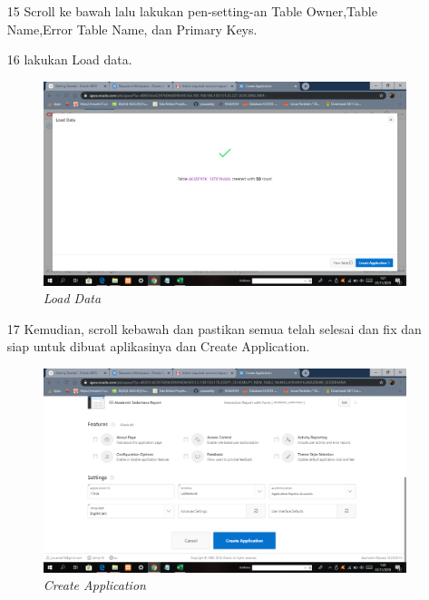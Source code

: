 \begin{enumerate}
\item[15] Scroll ke bawah lalu lakukan pen-setting-an Table Owner,Table Name,Error Table Name, dan Primary Keys.

 



\item[16] lakukan Load data.
 \begin{figure}[!htbp]
    \begin{center}
    \includegraphics[scale=0.2]{figures/laodeddata.png}
    \caption{\textit{Load Data}}
    \end{center}   
    \end{figure}




\item[17] Kemudian, scroll kebawah dan pastikan semua telah selesai dan fix dan siap untuk dibuat aplikasinya dan Create Application. 
 \begin{figure}[!htbp]
    \begin{center}
    \includegraphics[scale=0.2]{figures/createapp2.png}
    \caption{\textit{Create Application}}
    \end{center}   
    \end{figure}




\end{enumerate}
